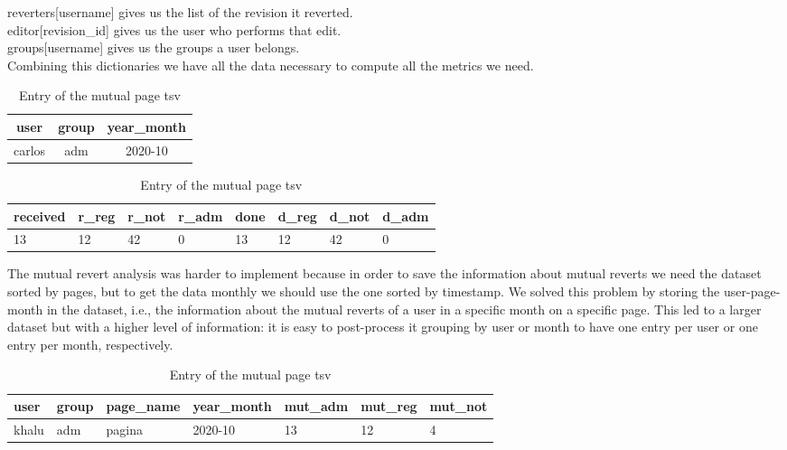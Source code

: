 reverters[username] gives us the list of the revision it reverted. \\
\indent editor[revision\_id] gives us the user who performs that edit. \\
\indent groups[username] gives us the groups a user belongs.\\

Combining this dictionaries we have all the data necessary to compute all the metrics we need.
\begin{table}[H]
    \centering
    \begin{tabularx}{\columnwidth}{@{}ccc@{}}
        \midrule
        \textbf{user} & \textbf{group} & \textbf{year\_month} \\ \toprule
        carlos & adm & 2020-10  \\
        
         \bottomrule
    \end{tabularx}
    \begin{tabularx}{\columnwidth}{@{}XXXXXXXX@{}}
        \midrule
        \textbf{received} & \textbf{r\_reg}  & \textbf{r\_not} & \textbf{r\_adm} & \textbf{done} & \textbf{d\_reg} & \textbf{d\_not} & \textbf{d\_adm}\\ \toprule
        13 & 12 & 42  & 0 & 13 & 12 & 42  & 0  \\
        
         \bottomrule
    \end{tabularx}
    
    \caption{Entry of the mutual page tsv \label{table:revks}}
\end{table}


The mutual revert analysis was harder to implement because in order to save the information about
mutual reverts we need the dataset sorted by pages, but to get the data monthly we should use the
one sorted by timestamp. We solved this problem by storing the user-page-month in the dataset, i.e.,
the information about the mutual reverts of a user in a specific month on a specific page.
This led to a larger dataset but with a higher level of information: it is easy to post-process it
grouping by user or month to have one entry per user or one entry per month, respectively. 


\begin{table}[H]
    \centering
    \begin{tabularx}{\columnwidth}{@{}XXXXXXX@{}}
        \midrule
        \textbf{user} & \textbf{group} & \textbf{page\_name}& \textbf{year\_month} & \textbf{mut\_adm}& \textbf{mut\_reg}& \textbf{mut\_not}\\ \toprule
        khalu & adm & pagina & 2020-10 & 13 & 12 & 4 \\
        
         \bottomrule
    \end{tabularx}

    
    \caption{Entry of the mutual page tsv \label{table:rjevks}}
\end{table}







